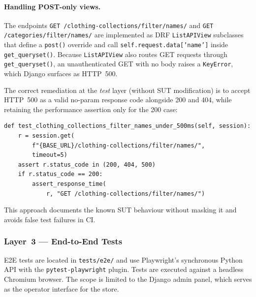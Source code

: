 \documentclass[12pt, a4paper]{article}
\begin{document}
\paragraph{Handling POST-only views.}
The endpoints \texttt{GET /clothing-collections/filter/names/} and
\texttt{GET /categories/filter/names/} are implemented as DRF
\texttt{ListAPIView} subclasses that define a \texttt{post()} override and
call \texttt{self.request.data['name']} inside \texttt{get\_queryset()}.
Because \texttt{ListAPIView} also routes GET requests through
\texttt{get\_queryset()}, an unauthenticated GET with no body raises a
\texttt{KeyError}, which Django surfaces as HTTP~500.

The correct remediation at the \textit{test} layer (without SUT modification)
is to accept HTTP~500 as a valid no-param response code alongside 200 and 404,
while retaining the performance assertion only for the 200 case:

\begin{lstlisting}[caption={Integration test accepting HTTP 500 for a parameterless GET on a POST-only filter view.}, label={lst:post_only}]
def test_clothing_collections_filter_names_under_500ms(self, session):
    r = session.get(
        f"{BASE_URL}/clothing-collections/filter/names/",
        timeout=5)
    assert r.status_code in (200, 404, 500)
    if r.status_code == 200:
        assert_response_time(
            r, "GET /clothing-collections/filter/names/")
\end{lstlisting}

This approach documents the known SUT behaviour without masking it and avoids
false test failures in CI.

\subsubsection{Layer~3 — End-to-End Tests}

E2E tests are located in \texttt{tests/e2e/} and use Playwright's synchronous
Python API with the \texttt{pytest-playwright} plugin.  Tests are executed
against a headless Chromium browser.  The scope is limited to the Django admin
panel, which serves as the operator interface for the store.
\end{document}
